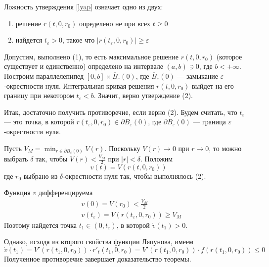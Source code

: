 Ложность утверждения \eqref{lyap} означает одно из двух:
\begin{enumerate}
    \item решение $r(t, 0, r_0)$ определено не при всех $t \ge 0$
    \item найдется $t_{\varepsilon} > 0$, такое что $|r(t_{\varepsilon}, 0, r_0)| \ge \varepsilon$
\end{enumerate}

Допустим, выполнено (1), то есть максимальное решение $r(t, 0, r_0)$ (которое существует и единственно) определено на интервале $(a,b) \ni 0$, где $b < +\infty$. Построим параллелепипед $[0,b] \times \overline{B}_{\varepsilon}(0)$, где $\overline{B}_{\varepsilon}(0)$ --- замыкание $\varepsilon$-окрестности нуля. Интегральная кривая решения $r(t, 0, r_0)$ выйдет на его границу при некотором $t_{\varepsilon} < b$. Значит, верно утверждение (2).

Итак, достаточно получить противоречие, если верно (2). Будем считать, что $t_{\varepsilon}$ --- это точка, в которой $r(t_{\varepsilon}, 0, r_0) \in \partial B_{\varepsilon}(0)$, где $\partial B_{\varepsilon}(0)$ --- граница $\varepsilon$-окрестности нуля.

Пусть $V_M = \displaystyle\min_{r \in \partial B_{\varepsilon}(0)}V(r)$. Поскольку $V(r) \to 0$ при $r \to 0$, то можно выбрать $\delta$ так, чтобы $V(r) < \frac{V_M}{2}$ при $|r| < \delta$. Положим
\begin{equation*}
    v(t) = V(r(t, 0, r_0))
\end{equation*}
где $r_0$ выбрано из $\delta$-окрестности нуля так, чтобы выполнялось (2).

Функция $v$ дифференцируема
\begin{equation*}
    \begin{aligned}
         & v(0) = V(r_0) < \frac{V_M}{2}                              \\
         & v(t_{\varepsilon}) = V(r(t_{\varepsilon}, 0, r_0)) \ge V_M
    \end{aligned}
\end{equation*}
Поэтому найдется точка $t_1 \in (0, t_{\varepsilon})$, в которой $\dot{v}(t_1) > 0$.

Однако, исходя из второго свойства функции Ляпунова, имеем
\begin{equation*}
    \dot{v}(t_1) = V'(r(t_1, 0, r_0))\cdot r'_t(t_1, 0, r_0) = V'(r(t_1, 0, r_0)) \cdot f(r(t_1, 0, r_0)) \le 0
\end{equation*}
Полученное противоречие завершает доказательство теоремы.\\

